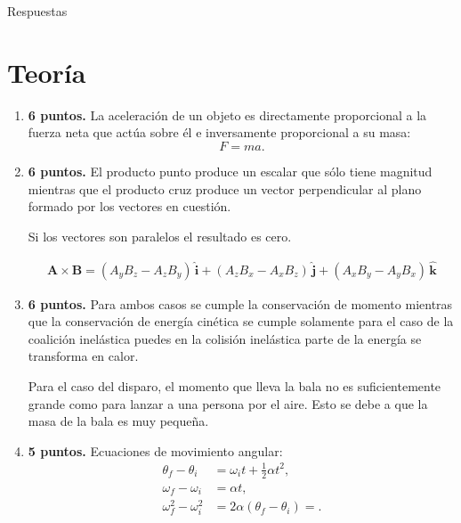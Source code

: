 \documentclass{article}
\begin{document}

\clearpage
\setcounter{section}{0}

\begin{center}
{\sc \huge Respuestas}
\end{center}

\section{Teoría} %
\label{sec:resteoria}


\begin{enumerate}

\item \textbf{6 puntos.} La aceleración de un objeto es directamente proporcional a la fuerza neta
que actúa sobre él e inversamente proporcional a su masa:
\begin{equation*}
F=ma.
\end{equation*}

\item \textbf{6 puntos.} El producto punto produce un escalar que sólo tiene magnitud mientras que
el producto cruz produce un vector perpendicular al plano formado por los
vectores en cuestión.

Si los vectores son paralelos el resultado es cero.

\begin{align*}
\mathbf{A} \times \mathbf{B} = 
(A_{y}B_{z} - A_{z}B_{y})\, \mathbf{\hat{i}} + 
(A_{z}B_{x} - A_{x}B_{z})\, \mathbf{\hat{j}} + 
(A_{x}B_{y} - A_{y}B_{x})\, \mathbf{\hat{k}}
\end{align*}

\item \textbf{6 puntos.} Para ambos casos se cumple la conservación de momento 
mientras que la conservación de energía cinética se cumple solamente para el
caso de la coalición inelástica puedes en la colisión inelástica parte de la
energía se transforma en calor.

Para el caso del disparo, el momento que lleva la bala no es suficientemente
grande como para lanzar a una persona por el aire. Esto se debe a que la masa
de la bala es muy pequeña.

\item \textbf{5 puntos.} Ecuaciones de movimiento angular:
\begin{align}
\theta_{f} - \theta_{i} &= \omega_{i}t + \frac{1}{2}\alpha t^{2}, \\
\omega_{f} - \omega_{i} &= \alpha t, \\
\omega_{f}^{2} - \omega_{i}^{2} &= 2\alpha (\theta_{f} - \theta_{i})
= .
\end{align}


\end{enumerate}
\end{document}
